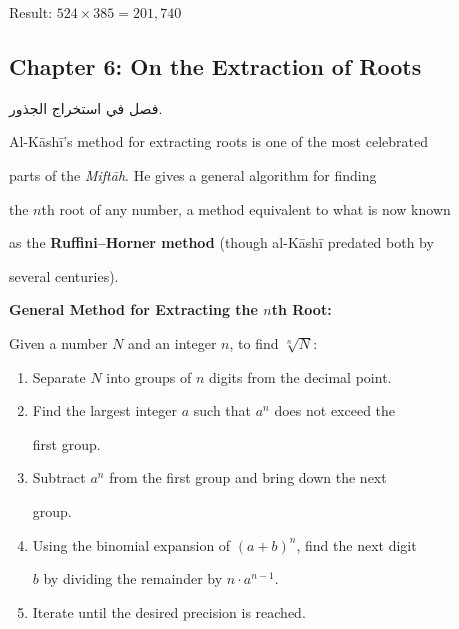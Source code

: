 \documentclass[11pt,a4paper]{article}
\newenvironment{arabicbox}{%

  \begin{framed}

  \begin{minipage}{\linewidth-2\fboxsep-2\fboxrule}

  \setlength{\parindent}{0pt}

  \linespread{1.3}\selectfont

}{%

  \end{minipage}

  \end{framed}

}
\newenvironment{mathalgo}{%

  \par\vspace{0.3cm}

  \begin{framed}

  \setlength{\parindent}{0pt}

}{%

  \end{framed}

  \par\vspace{0.3cm}

}
\begin{document}
\noindent Result: $\boxed{524 \times 385 = 201{,}740}$



\subsection{Chapter 6: On the Extraction of Roots}



\begin{arabicbox}

\begin{Arabic}

فصل في استخراج الجذور.

\end{Arabic}

\end{arabicbox}



\vspace{0.3cm}



Al-K\=ash\=i's method for extracting roots is one of the most celebrated

parts of the \textit{Mift\=ah}. He gives a general algorithm for finding

the $n$th root of any number, a method equivalent to what is now known

as the \textbf{Ruffini--Horner method} (though al-K\=ash\=i predated both by

several centuries).



\begin{mathalgo}

\textbf{General Method for Extracting the $n$th Root:}



Given a number $N$ and an integer $n$, to find $\sqrt[n]{N}$:

\begin{enumerate}[nosep]

  \item Separate $N$ into groups of $n$ digits from the decimal point.

  \item Find the largest integer $a$ such that $a^n$ does not exceed the

  first group.

  \item Subtract $a^n$ from the first group and bring down the next

  group.

  \item Using the binomial expansion of $(a + b)^n$, find the next digit

  $b$ by dividing the remainder by $n \cdot a^{n-1}$.

  \item Iterate until the desired precision is reached.

\end{enumerate}

\end{mathalgo}
\end{document}
